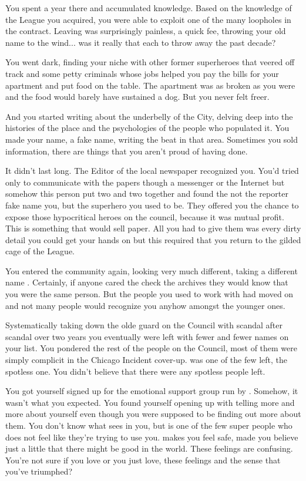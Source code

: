 \documentclass[char]{LRSguildcamp1}
\begin{document}
You spent a year there and accumulated knowledge. Based on the knowledge of the League you acquired, you were able to exploit one of the many loopholes in the contract. Leaving was surprisingly painless, a quick fee, throwing your old name to the wind... was it really that each to throw away the past decade?  

You went dark, finding your niche with other former superheroes that veered off track and some petty criminals whose jobs helped you pay the bills for your apartment and put food on the table. The apartment was as broken as you were and the food would barely have sustained a dog. But you never felt freer. 

And you started writing about the underbelly of the City, delving deep into the histories of the place and the psychologies of the people who populated it. You made your name, a fake name, writing the beat in that area. Sometimes you sold information, there are things that you aren't proud of having done. 

It didn't last long. The Editor of the local newspaper recognized you. You'd tried only to communicate with the papers though a messenger or the Internet but somehow this person put two and two together and found the not the reporter fake name you, but the superhero you used to be. They offered you the chance to expose those hypocritical heroes on the council, because it was mutual profit. This is something that would sell paper. All you had to give them was every dirty detail you could get your hands on but this required that you return to the gilded cage of the League.

You entered the community again, looking very much different, taking a different name \cYoungest{}. Certainly, if anyone cared the check the archives they would know that you were the same person. But the people you used to work with had moved on and not many people would recognize you anyhow amongst the younger ones.  

Systematically taking down the olde guard on the Council with scandal after scandal over two years you eventually were left with fewer and fewer names on your list. You pondered the rest of the people on the Council, most of them were simply complicit in the Chicago Incident cover-up. \cYoungest{} was one of the few left, the spotless one. You didn't believe that there were any spotless people left. 
 
You got yourself signed up for the emotional support group run by \cYoungest{}. Somehow, it wasn't what you expected. You found yourself opening up with \cYoungest{} telling \cYoungest{} more and more about yourself even though you were supposed to be finding out more about them. You don't know what \cYoungest{} sees in you, but \cYoungest{} is one of the few super people who does not feel like they're trying to use you. \cYoungest{} makes you feel safe, made you believe just a little that there might be good in the world. These feelings are confusing. You're not sure if you love \cYoungest{} or you just love, these feelings and the sense that you've triumphed?
\end{document}
